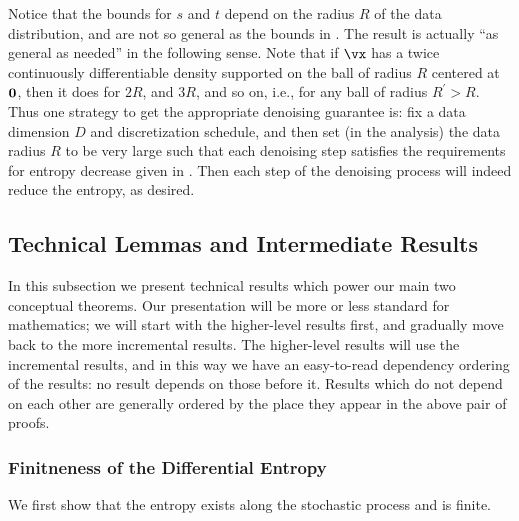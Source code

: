 \documentclass[../../book-main.tex]{subfiles}
\begin{document}
Notice that the bounds for \(s\) and \(t\) depend on the radius \(R\) of the data distribution, and are not so general as the bounds in . The result is actually ``as general as needed'' in the following sense. Note that if \(\vx\) has a twice continuously differentiable density supported on the ball of radius \(R\) centered at \(\bm{0}\), then it does for \(2R\), and \(3R\), and so on, i.e., for any ball of radius \(R^{\prime} > R\). Thus one strategy to get the appropriate denoising guarantee is: fix a data dimension \(D\) and discretization schedule, and then set (in the analysis) the data radius \(R\) to be very large such that each denoising step satisfies the requirements for entropy decrease given in . Then each step of the denoising process will indeed reduce the entropy, as desired.

 
\subsection{Technical Lemmas and Intermediate Results}\label{sub:app_diffusion_intermediate_results}

In this subsection we present technical results which power our main two conceptual theorems. Our presentation will be more or less standard for mathematics; we will start with the higher-level results first, and gradually move back to the more incremental results. The higher-level results will use the incremental results, and in this way we have an easy-to-read dependency ordering of the results: no result depends on those before it. Results which do not depend on each other are generally ordered by the place they appear in the above pair of proofs. 


\subsubsection{Finitneness of the Differential Entropy}

We first show that the entropy exists along the stochastic process and is finite.
\end{document}
